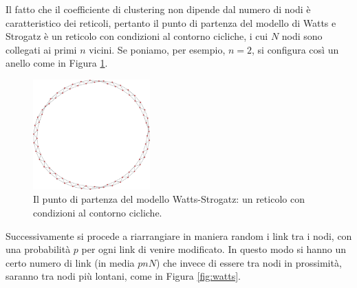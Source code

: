 Il fatto che il coefficiente di clustering non dipende dal numero di nodi è caratteristico dei reticoli, pertanto il punto di partenza del modello di Watts e Strogatz è un reticolo con condizioni al contorno cicliche, i cui $N$ nodi sono collegati ai primi $n$ vicini. Se poniamo, per esempio, $n = 2$, si configura così un anello come in Figura \ref{fig:ring}.
\clearpage
\begin{figure}[t]
	\centering
	\includegraphics[width=0.4\textwidth]{./Immagini/Teoria/zoomring}
	\caption[Reticolo ciclico.]{Il punto di partenza del modello Watts-Strogatz: un reticolo con condizioni al contorno cicliche.}
	\label{fig:ring}
\end{figure}

Successivamente si procede a riarrangiare in maniera random i link tra i nodi, con una probabilità $p$ per ogni link di venire modificato. In questo modo si hanno un certo numero di link (in media $pnN$) che invece di essere tra nodi in prossimità, saranno tra nodi più lontani, come in Figura \ref{fig:watts}.

